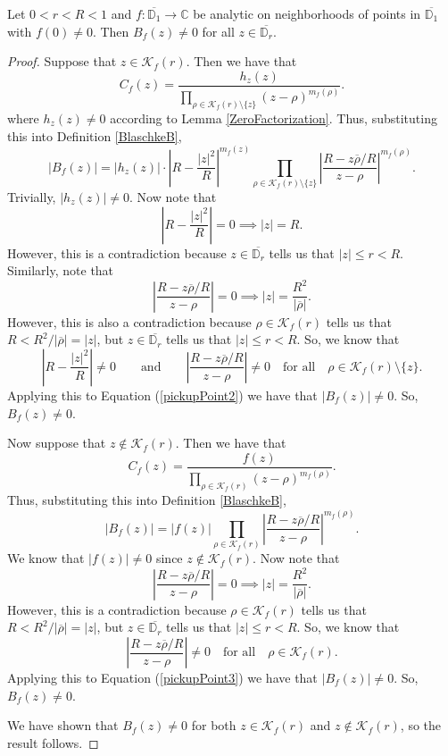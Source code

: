 \begin{lemma}[BlaschkeNonZero]
\label{BlaschkeNonZero}
\leanok
Let $0 < r < R<1$ and $f:\overline{\mathbb{D}_1}\to\mathbb{C}$ be analytic on
    neighborhoods of points in $\overline{\mathbb{D}_1}$ with $f(0)\neq 0$. Then $B_f(z)\neq 0$
    for all $z\in\overline{\mathbb{D}_r}$.
\end{lemma}
\begin{proof}
\leanok
Suppose that $z\in\mathcal{K}_f(r)$. Then we have that
    $$C_f(z)=\frac{h_z(z)}{\displaystyle\prod_{\rho\in\mathcal{K}_f(r)\setminus\{z\}}
      (z-\rho)^{m_f(\rho)}}.$$
    where $h_z(z)\neq 0$ according to Lemma \ref{ZeroFactorization}. Thus, substituting
    this into Definition \ref{BlaschkeB},
    \begin{equation}\label{pickupPoint2}
        |B_f(z)|=|h_z(z)|\cdot\left|R-\frac{|z|^2}{R}\right|^{m_f(z)}
          \prod_{\rho\in\mathcal{K}_f(r)\setminus\{z\}}
          \left|\frac{R-z\overline{\rho}/R}{z-\rho}\right|^{m_f(\rho)}.
    \end{equation}
    Trivially, $|h_z(z)|\neq 0$. Now note that
    $$\left|R-\frac{|z|^2}{R}\right|=0\implies|z|=R.$$
    However, this is a contradiction because $z\in\overline{\mathbb{D}_r}$ tells us that
    $|z|\leq r < R$. Similarly, note that
    $$\left|\frac{R-z\overline{\rho}/R}{z-\rho}\right|=0\implies|z|=\frac{R^2}{|\overline{\rho}|}.$$
    However, this is also a contradiction because $\rho\in\mathcal{K}_f(r)$ tells us that
    $R < R^2/|\overline{\rho}|=|z|$, but $z\in\overline{\mathbb{D}_r}$ tells us that
    $|z|\leq r < R$. So, we know that
    $$\left|R-\frac{|z|^2}{R}\right|\neq 0\qquad\text{and}\qquad
      \left|\frac{R-z\overline{\rho}/R}{z-\rho}\right|\neq 0
      \quad\text{for all}\quad\rho\in\mathcal{K}_f(r)\setminus\{z\}.$$
    Applying this to Equation (\ref{pickupPoint2}) we have that $|B_f(z)|\neq 0$.
    So, $B_f(z)\neq 0$.

    Now suppose that $z\not\in\mathcal{K}_f(r)$. Then we have that
    $$C_f(z)=\frac{f(z)}{\displaystyle\prod_{\rho\in\mathcal{K}_f(r)}(z-\rho)^{m_f(\rho)}}.$$
    Thus, substituting this into Definition \ref{BlaschkeB},
    \begin{equation}\label{pickupPoint3}
        |B_f(z)|=|f(z)|\prod_{\rho\in\mathcal{K}_f(r)}
          \left|\frac{R-z\overline{\rho}/R}{z-\rho}\right|^{m_f(\rho)}.
    \end{equation}
    We know that $|f(z)|\neq 0$ since $z\not\in\mathcal{K}_f(r)$. Now note that
    $$\left|\frac{R-z\overline{\rho}/R}{z-\rho}\right|=0\implies|z|=\frac{R^2}{|\overline{\rho}|}.$$
    However, this is a contradiction because $\rho\in\mathcal{K}_f(r)$ tells us that
    $R < R^2/|\overline{\rho}|=|z|$, but $z\in\overline{\mathbb{D}_r}$ tells us that
    $|z|\leq r < R$. So, we know that
    $$\left|\frac{R-z\overline{\rho}/R}{z-\rho}\right|\neq 0
      \quad\text{for all}\quad\rho\in\mathcal{K}_f(r).$$
    Applying this to Equation (\ref{pickupPoint3}) we have that $|B_f(z)|\neq 0$.
    So, $B_f(z)\neq 0$.

    We have shown that $B_f(z)\neq 0$ for both $z\in\mathcal{K}_f(r)$ and
    $z\not\in\mathcal{K}_f(r)$, so the result follows.
\end{proof}
